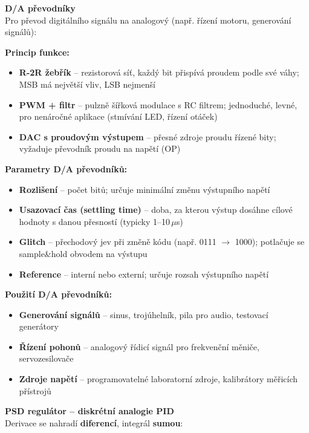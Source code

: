\documentclass[a4paper,10pt]{article}
\begin{document}
\begin{vysvetlenibox}
\textbf{D/A převodníky}\\
Pro převod digitálního signálu na analogový (např. řízení motoru, generování signálů):

\textbf{Princip funkce:}
\begin{itemize}[noitemsep, leftmargin=1.4em, topsep=4pt]
    \item \textbf{R-2R žebřík} -- rezistorová síť, každý bit přispívá proudem
          podle své váhy; MSB má největší vliv, LSB nejmenší
    \item \textbf{PWM + filtr} -- pulzně šířková modulace s RC filtrem;
          jednoduché, levné, pro nenáročné aplikace (stmívání LED, řízení otáček)
    \item \textbf{DAC s proudovým výstupem} -- přesné zdroje proudu řízené bity;
          vyžaduje převodník proudu na napětí (OP)
\end{itemize}

\textbf{Parametry D/A převodníků:}
\begin{itemize}[noitemsep, leftmargin=1.4em, topsep=4pt]
    \item \textbf{Rozlišení} -- počet bitů; určuje minimální změnu výstupního napětí
    \item \textbf{Usazovací čas (settling time)} -- doba, za kterou výstup dosáhne
          cílové hodnoty s danou přesností (typicky 1--10\,$\mu$s)
    \item \textbf{Glitch} -- přechodový jev při změně kódu (např. 0111 $\to$ 1000);
          potlačuje se sample\&hold obvodem na výstupu
    \item \textbf{Reference} -- interní nebo externí; určuje rozsah výstupního napětí
\end{itemize}

\textbf{Použití D/A převodníků:}
\begin{itemize}[noitemsep, leftmargin=1.4em, topsep=4pt]
    \item \textbf{Generování signálů} -- sinus, trojúhelník, pila pro audio,
          testovací generátory
    \item \textbf{Řízení pohonů} -- analogový řídicí signál pro frekvenční měniče,
          servozesilovače
    \item \textbf{Zdroje napětí} -- programovatelné laboratorní zdroje,
          kalibrátory měřicích přístrojů
\end{itemize}

\textbf{PSD regulátor -- diskrétní analogie PID}\\
Derivace se nahradí \textbf{diferencí}, integrál \textbf{sumou}:


\end{vysvetlenibox}
\end{document}

